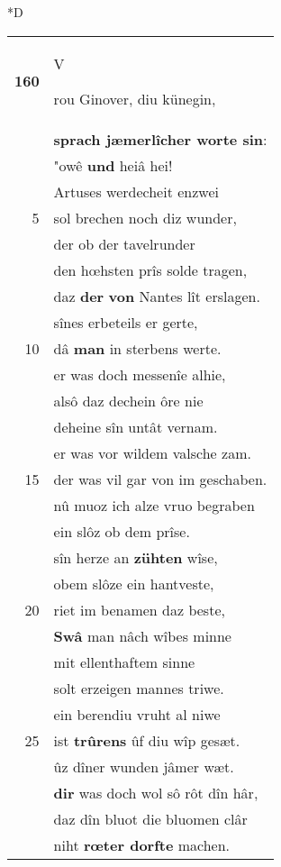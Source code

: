 \documentclass[8pt,a4paper,notitlepage]{article}
\begin{document}
\begin{table}[ht]
\begin{minipage}[t]{0.5\linewidth}
\small
\begin{center}*D
\end{center}
\begin{tabular}{rl}
\textbf{160} & \begin{large}V\end{large}rou Ginover, diu künegin,\\ 
 & \textbf{sprach jæmerlîcher worte sin}:\\ 
 & "owê \textbf{und} heiâ hei!\\ 
 & Artuses werdecheit enzwei\\ 
5 & sol brechen noch diz wunder,\\ 
 & der ob der tavelrunder\\ 
 & den hœhsten prîs solde tragen,\\ 
 & daz \textbf{der} \textbf{von} Nantes lît erslagen.\\ 
 & sînes erbeteils er gerte,\\ 
10 & dâ \textbf{man} in sterbens werte.\\ 
 & er was doch messenîe alhie,\\ 
 & alsô daz dechein ôre nie\\ 
 & deheine sîn untât vernam.\\ 
 & er was vor wildem valsche zam.\\ 
15 & der was vil gar von im geschaben.\\ 
 & nû muoz ich alze vruo begraben\\ 
 & ein slôz ob dem prîse.\\ 
 & sîn herze an \textbf{zühten} wîse,\\ 
 & obem slôze ein hantveste,\\ 
20 & riet im benamen daz beste,\\ 
 & \textbf{Swâ} man nâch wîbes minne\\ 
 & mit ellenthaftem sinne\\ 
 & solt erzeigen mannes triwe.\\ 
 & ein berendiu vruht al niwe\\ 
25 & ist \textbf{trûrens} ûf diu wîp gesæt.\\ 
 & ûz dîner wunden jâmer wæt.\\ 
 & \textbf{dir} was doch wol sô rôt dîn hâr,\\ 
 & daz dîn bluot die bluomen clâr\\ 
 & niht \textbf{rœter dorfte} machen.\\ 

\end{tabular}
\end{minipage}
\end{table}
\end{document}
